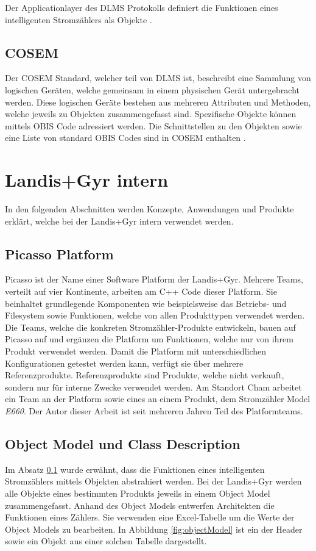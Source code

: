 Der Applicationlayer des \ac{DLMS} Protokolls definiert die Funktionen eines intelligenten Stromzählers als Objekte \parencite{vyas2012advance}.

\subsection{COSEM}\label{cosem}
Der \ac{COSEM} Standard, welcher teil von \ac{DLMS} ist, beschreibt eine Sammlung von logischen Geräten, welche gemeinsam in einem physischen Gerät untergebracht werden.
Diese logischen Geräte bestehen aus mehreren Attributen und Methoden, welche jeweils zu Objekten zusammengefasst sind.
Spezifische Objekte können mittels \ac{OBIS} Code adressiert werden.
Die Schnittstellen zu den Objekten sowie eine Liste von standard \ac{OBIS} Codes sind in \ac{COSEM} enthalten  \parencite{vyas2012advance}.


\section{Landis+Gyr intern}\label{lgintern}
In den folgenden Abschnitten werden Konzepte, Anwendungen und Produkte erklärt, welche bei der Landis+Gyr intern verwendet werden.

\subsection{Picasso Platform}\label{picasso}
Picasso ist der Name einer Software Platform der Landis+Gyr.
Mehrere Teams, verteilt auf vier Kontinente, arbeiten am C++ Code dieser Platform.
Sie beinhaltet grundlegende Komponenten wie beispielsweise das Betriebs- und Filesystem sowie Funktionen, welche von allen Produkttypen verwendet werden.
Die Teams, welche die konkreten Stromzähler-Produkte entwickeln, bauen auf Picasso auf und ergänzen die Platform um Funktionen, welche nur von ihrem Produkt verwendet werden.
Damit die Platform mit unterschiedlichen Konfigurationen getestet werden kann, verfügt sie über mehrere Referenzprodukte.
Referenzprodukte sind Produkte, welche nicht verkauft, sondern nur für interne Zwecke verwendet werden.
Am Standort Cham arbeitet ein Team an der Platform sowie eines an einem Produkt, dem Stromzähler Model \textit{E660}.
Der Autor dieser Arbeit ist seit mehreren Jahren Teil des Platformteams.



\subsection{Object Model und Class Description}\label{objectModelsClassDescriptions}
Im Absatz \ref{cosem} wurde erwähnt, dass die Funktionen eines intelligenten Stromzählers mittels Objekten abstrahiert werden.
Bei der Landis+Gyr werden alle Objekte eines bestimmten Produkts jeweils in einem Object Model zusammengefasst.
Anhand des Object Models entwerfen Architekten die Funktionen eines Zählers.
Sie verwenden eine Excel-Tabelle um die Werte der Object Models zu bearbeiten.
In Abbildung \ref{fig:objectModel} ist ein der Header sowie ein Objekt aus einer solchen Tabelle dargestellt.

